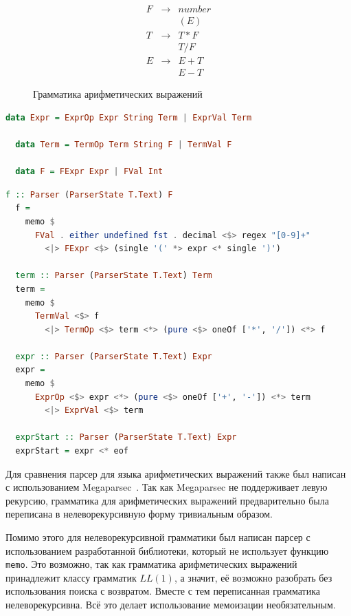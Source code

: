 \documentclass[times]{itmo-student-thesis}
\begin{document}
\begin{figure}[!h]
  \caption{Грамматика арифметических выражений}\label{fig:expr_grammar}
  \[
      \begin{array}{lll}
          F & \to & number \\
            &     & (E) \\
          T & \to & T * F \\
            &     & T / F \\
          E & \to & E + T \\
            &     & E - T
      \end{array}
  \]
\end{figure}

\begin{lstlisting}[language=Haskell,float=!h,caption={Семантические значения языка арифметических выражений},label={lst:expr_semantics}]
  data Expr = ExprOp Expr String Term | ExprVal Term

  data Term = TermOp Term String F | TermVal F

  data F = FExpr Expr | FVal Int
\end{lstlisting}

\begin{lstlisting}[language=Haskell,float=!h,caption={Парсер арифметических выражений},label={lst:expr_parser}]
  f :: Parser (ParserState T.Text) F
  f =
    memo $
      FVal . either undefined fst . decimal <$> regex "[0-9]+"
        <|> FExpr <$> (single '(' *> expr <* single ')')

  term :: Parser (ParserState T.Text) Term
  term =
    memo $
      TermVal <$> f
        <|> TermOp <$> term <*> (pure <$> oneOf ['*', '/']) <*> f

  expr :: Parser (ParserState T.Text) Expr
  expr =
    memo $
      ExprOp <$> expr <*> (pure <$> oneOf ['+', '-']) <*> term
        <|> ExprVal <$> term

  exprStart :: Parser (ParserState T.Text) Expr
  exprStart = expr <* eof
\end{lstlisting}

Для сравнения парсер для языка арифметических выражений также был написан с использованием Megaparsec~\cite{noauthor_megaparsec_nodate}.
Так как  Megaparsec не поддерживает левую рекурсию, грамматика для арифметических выражений предварительно была
переписана в нелеворекурсивную форму тривиальным образом. 

Помимо этого для нелеворекурсивной грамматики был написан парсер с использованием разработанной библиотеки, который не
использует функцию \lstinline{memo}. Это возможно, так как грамматика арифметических выражений принадлежит классу
грамматик $LL(1)$, а значит, её возможно разобрать без использования поиска с возвратом. Вместе с тем
переписанная грамматика нелеворекурсивна. Всё это делает использование мемоизации необязательным.
\end{document}
